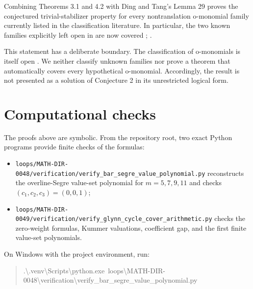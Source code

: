 \documentclass[11pt]{article}
\begin{document}
Combining Theorems 3.1 and 4.2 with Ding and Tang's Lemma 29 proves the
conjectured trivial-stabilizer property for every nontranslation o-monomial
family currently listed in the classification literature. In particular, the
two known families explicitly left open in \cite{ding-tang} are now covered
\cite[Lemma~29 and after Corollary~30]{ding-tang}; \cite[Section~2]{kolsch-kyureghyan}.

This statement has a deliberate boundary. The classification of o-monomials is
itself open \cite{kolsch-kyureghyan}. We neither classify unknown families nor prove a theorem that
automatically covers every hypothetical o-monomial. Accordingly, the result is
not presented as a solution of Conjecture 2 in its unrestricted logical form.

\section{Computational checks}


The proofs above are symbolic. From the repository root, two exact Python
programs provide finite checks of the formulas:

\begin{itemize}
\item \texttt{loops/MATH-\allowbreak{}DIR-\allowbreak{}0048/verification/verify\_\allowbreak{}bar\_\allowbreak{}segre\_\allowbreak{}value\_\allowbreak{}polynomial.py}
reconstructs the overline-Segre
value-set polynomial for \(m=5,7,9,11\) and checks
\((c_1,c_2,c_3)=(0,0,1)\);
\item \texttt{loops/MATH-\allowbreak{}DIR-\allowbreak{}0049/verification/verify\_\allowbreak{}glynn\_\allowbreak{}cycle\_\allowbreak{}cover\_\allowbreak{}arithmetic.py}
checks the zero-weight formulas,
Kummer valuations, coefficient gap, and the first finite value-set
polynomials.

\end{itemize}

On Windows with the project environment, run:

\begin{quote}\footnotesize\ttfamily
.\textbackslash{}\allowbreak{}.venv\textbackslash{}\allowbreak{}Scripts\textbackslash{}\allowbreak{}python.exe\ \allowbreak{}loops\textbackslash{}\allowbreak{}MATH-\allowbreak{}DIR-\allowbreak{}0048\textbackslash{}\allowbreak{}verification\textbackslash{}\allowbreak{}verify\_\allowbreak{}bar\_\allowbreak{}segre\_\allowbreak{}value\_\allowbreak{}polynomial.py\par
\end{quote}
\end{document}
